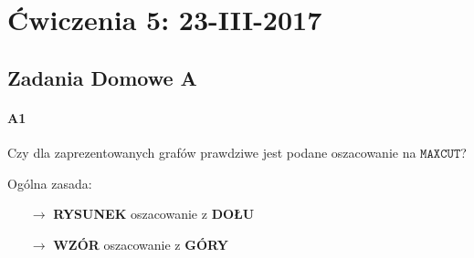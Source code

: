 \section{Ćwiczenia 5: 23-III-2017}

\subsection{Zadania Domowe A}
\paragraph{A1} Czy dla zaprezentowanych grafów prawdziwe jest podane oszacowanie na $\mathtt{MAX CUT}$?

Ogólna zasada:
\begin{itemize}
\item[$\rightarrow$] \textbf{RYSUNEK} oszacowanie z \textbf{DOŁU}
\item[$\rightarrow$] \textbf{WZÓR} oszacowanie z \textbf{GÓRY}
\end{itemize}

